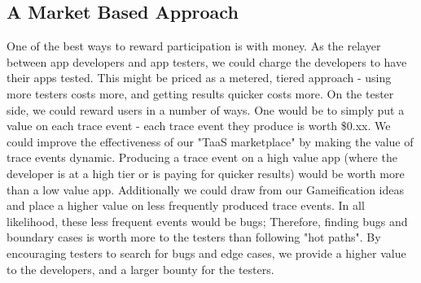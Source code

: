 \subsection{A Market Based Approach}
One of the best ways to reward participation is with money. As the relayer between app developers
and app testers, we could charge the developers to have their apps tested. This might be priced
as a metered, tiered approach - using more testers costs more, and getting results quicker costs more.
On the tester side, we could reward users in a number of ways. One would be to simply put a
value on each trace event - each trace event they produce is worth \$0.xx. We could improve the
effectiveness of our "TaaS marketplace" by making the value of trace events dynamic. Producing a trace
event on a high value app (where the developer is at a high tier or is paying for quicker results) would
be worth more than a low value app. Additionally we could draw from our Gameification
ideas and place a higher value on less frequently produced trace events. In all likelihood, these
less frequent events would be bugs; Therefore, finding bugs and boundary cases is worth more to the 
testers than following "hot paths". By encouraging testers to search for bugs and edge cases, we
provide a higher value to the developers, and a larger bounty for the testers.

